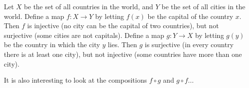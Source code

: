 \begin{exl}
Let $X$ be the set of all countries in the world, and $Y$ be the set of all cities in the world.
Define a map $f \colon X \to Y$ by letting $f(x)$ be the capital of the country $x$.
Then $f$ is injective (no city can be the capital of two countries), but not surjective (some cities are not capitals).
Define a map $g \colon Y \to X$ by letting $g(y)$ be the country in which the city $y$ lies.
Then $g$ is surjective (in every country there is at least one city), but not injective (some countries have more than one city).

It is also interesting to look at the compositions $f \circ g$ and $g \circ f$...
\end{exl}